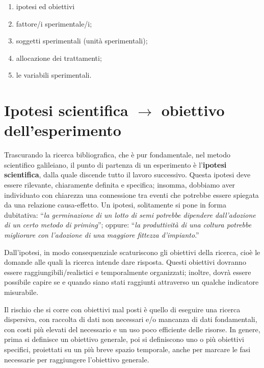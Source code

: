 \documentclass[a4paper,12pt,oneside]{book}
\providecommand{\tightlist}{%
  \setlength{\itemsep}{0pt}\setlength{\parskip}{0pt}}
\begin{document}
\begin{enumerate}
\def\labelenumi{\arabic{enumi}.}
\tightlist
\item
  ipotesi ed obiettivi
\item
  fattore/i sperimentale/i;
\item
  soggetti sperimentali (unità sperimentali);
\item
  allocazione dei trattamenti;
\item
  le variabili sperimentali.
\end{enumerate}

\hypertarget{ipotesi-scientifica-rightarrow-obiettivo-dellesperimento}{%
\section{\texorpdfstring{Ipotesi scientifica \(\rightarrow\) obiettivo dell'esperimento}{Ipotesi scientifica \textbackslash rightarrow obiettivo dell'esperimento}}\label{ipotesi-scientifica-rightarrow-obiettivo-dellesperimento}}

Trascurando la ricerca bibliografica, che è pur fondamentale, nel metodo scientifico galileiano, il punto di partenza di un esperimento è l'\textbf{ipotesi scientifica}, dalla quale discende tutto il lavoro successivo. Questa ipotesi deve essere rilevante, chiaramente definita e specifica; insomma, dobbiamo aver individuato con chiarezza una connessione tra eventi che potrebbe essere spiegata da una relazione causa-effetto. Un ipotesi, solitamente si pone in forma dubitativa: ``\emph{la germinazione di un lotto di semi potrebbe dipendere dall'adozione di un certo metodo di priming}''; oppure: ``\emph{la produttività di una coltura potrebbe migliorare con l'adozione di una maggiore fittezza d'impianto}.''

Dall'ipotesi, in modo consequenziale scaturiscono gli obiettivi della ricerca, cioè le domande alle quali la ricerca intende dare risposta. Questi obiettivi dovranno essere raggiungibili/realistici e temporalmente organizzati; inoltre, dovrà essere possibile capire se e quando siano stati raggiunti attraverso un qualche indicatore misurabile.

Il rischio che si corre con obiettivi mal posti è quello di eseguire una ricerca dispersiva, con raccolta di dati non necessari e/o mancanza di dati fondamentali, con costi più elevati del necessario e un uso poco efficiente delle risorse. In genere, prima si definisce un obiettivo generale, poi si definiscono uno o più obiettivi specifici, proiettati su un più breve spazio temporale, anche per marcare le fasi necessarie per raggiungere l'obiettivo generale.
\end{document}
